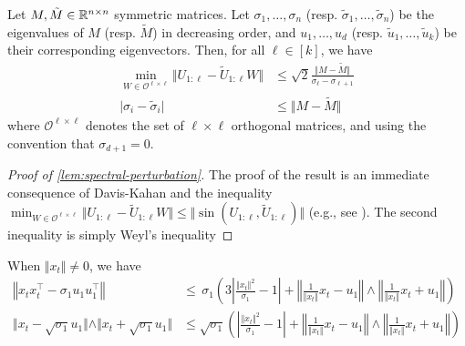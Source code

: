 \begin{lemma}\label{lem:spectral-perturbation}
    Let $M, \tilde{M} \in \mathbb{R}^{n \times n}$ symmetric matrices. Let $\sigma_1, \dots, \sigma_n$ (resp. $\tilde{\sigma}_1, \dots, \tilde{\sigma}_n$) be the eigenvalues of $M$ (resp. $\tilde{M}$) in decreasing order, and $u_1, \dots, u_d$ (resp. $\tilde{u}_1, \dots, \tilde{u}_k$) be their corresponding eigenvectors. Then, for all $\ell \in [k]$, we have   
    \begin{align}
        \min_{W \in \mathcal{O}^{\ell \times \ell}} \Vert U_{1:\ell} - \tilde{U}_{1:\ell} W \Vert  & \le \sqrt{2} \frac{\Vert M - \tilde{M} \Vert }{\sigma_\ell - \sigma_{\ell+1}} \\
        \vert \sigma_i - \tilde{\sigma}_{i} \vert  & \le  \Vert M - \widetilde{M} \Vert  
    \end{align}
    where $\mathcal{O}^{\ell \times \ell}$ denotes the set of $\ell \times \ell$ orthogonal matrices, and using the convention that $\sigma_{d+1} = 0$.
\end{lemma}
\begin{proof}[Proof of \ref{lem:spectral-perturbation}]
    The proof of the result is an immediate consequence of Davis-Kahan and the inequality $\min_{W \in \mathcal{O}^{\ell \times \ell}} \Vert U_{1:\ell} - \tilde{U}_{1:\ell} W \Vert \le \Vert \sin( U_{1:\ell}, \tilde{U}_{1:\ell}) \Vert $ (e.g., see \cite{cape2019two}). The second inequality is simply Weyl's inequality
\end{proof}



\begin{lemma}\label{lem:error-decomposition}
    When $\Vert x_t \Vert \neq 0$, we have 
    \begin{align*}
        \left\Vert x_t x_t^\top - \sigma_1 u_1 u_1^\top \right\Vert  & \le \, \sigma_1 \left( 3 \left\vert \frac{\Vert x_t \Vert^2}{\sigma_1} - 1 \right\vert + \left\Vert \frac{1}{\Vert x_t \Vert} x_t - u_1 \right\Vert \wedge \left\Vert \frac{1}{\Vert x_t \Vert} x_t + u_1 \right\Vert   \right) \\ 
        \Vert x_t - \sqrt{\sigma_1} u_1 \Vert \wedge \Vert x_t + \sqrt{\sigma_1} u_1 \Vert  & \le \sqrt{\sigma_1}\left( \left\vert \frac{\Vert x_t \Vert^2}{\sigma_1} - 1 \right\vert +  \left\Vert \frac{1}{\Vert x_t \Vert} x_t - u_1 \right\Vert \wedge \left\Vert \frac{1}{\Vert x_t \Vert} x_t + u_1 \right\Vert  \right)
    \end{align*}
\end{lemma}

